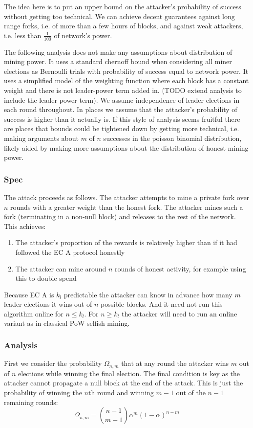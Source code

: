 \documentclass{article}
\begin{document}
The idea here is to put an upper bound on the attacker's probability of success without getting too technical.  We can achieve decent guarantees against long range forks, i.e. of more than a few hours of blocks, and against weak attackers, i.e. less than $\frac{1}{100}$ of network's power.

The following analysis does not make any assumptions about distribution of mining power.  It uses a standard chernoff bound when considering all miner elections as Bernoulli trials with probability of success equal to network power.  It uses a simplified model of the weighting function where each block has a constant weight and there is not leader-power term added in.  (TODO extend analysis to include the leader-power term).  We assume independence of leader elections in each round throughout.  In places we assume that the attacker's probability of success is higher than it actually is.  If this style of analysis seems fruitful there are places that bounds could be tightened down by getting more technical, i.e. making arguments about $m$ of $n$ successes in the poisson binomial distribution, likely aided by making more assumptions about the distribution of honest mining power.

\subsubsection{Spec}
The attack proceeds as follows.  The attacker attempts to mine a private fork over $n$ rounds with a greater weight than the honest fork.  The attacker mines such a fork (terminating in a non-null block) and releases to the rest of the network.  This achieves:
\begin{enumerate}
    \item 
    The attacker's proportion of the rewards is relatively higher than if it had followed the EC A protocol honestly
    \item
    The attacker can mine around $n$ rounds of honest activity, for example using this to double spend
\end{enumerate}Because EC A is $k_l$ predictable the attacker can know in advance how many $m$ leader elections it wins out of $n$ possible blocks.  And it need not run this algorithm online for $n \leq k_l$.  For $n \geq k_l$ the attacker will need to run an online variant as in classical PoW selfish mining.

\subsubsection{Analysis}
First we consider the probability $\Omega_{n,m}$ that at any round the attacker wins $m$ out of $n$ elections while winning the final election.  The final condition is key as the attacker cannot propagate a null block at the end of the attack.  This is just the probability of winning the $n$th round and winning $m-1$ out of the $n-1$ remaining rounds:
$$
\Omega_{n,m} = \binom{n-1}{m-1}\alpha^m (1-\alpha)^{n-m}
$$
\end{document}
